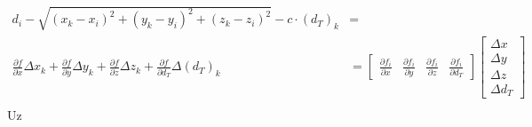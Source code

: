 \documentclass[a4paper,twoside,12pt]{memoir} %
\begin{document}
\begin{align*}
d_i - \sqrt{(x_k-x_i)^{2}+(y_k-y_i)^{2}+(z_k-z_i)^{2}} - c\cdot (d_T)_k & = \\
\frac{\partial f}{\partial x}\Delta x_k + \frac{\partial f}{\partial y}\Delta y_k + \frac{\partial f}{\partial z}\Delta z_k + \frac{\partial f}{\partial d_T}\Delta (d_T)_k &= 
\begin{bmatrix}
\frac{\partial f_i}{\partial x} &
\frac{\partial f_i}{\partial y} &
\frac{\partial f_i}{\partial z} &
\frac{\partial f_i}{\partial d_T}
\end{bmatrix}
\begin{bmatrix}
\Delta x \\
\Delta y \\
\Delta z \\
\Delta d_T
\end{bmatrix} \\ 
\end{align*}
Uz 
\end{document}
